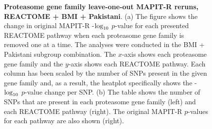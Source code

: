 \documentclass[12pt,a4paper]{article}
\def\log{{\rm log}}
\begin{document}
\begin{figure}[ht]
\centering
\vspace*{-.5cm}
\par
{}
\caption[TBD]{\textbf{Proteasome gene family leave-one-out MAPIT-R reruns, REACTOME + BMI + Pakistani}. (a) The figure shows the change in original MAPIT-R -$\log_{10}$ $p$-value for each presented REACTOME pathway when each proteasome gene family is removed one at a time. The analyses were conducted in the BMI + Pakistani subgroup combination. The $x$-axis shows each proteasome gene family and the $y$-axis shows each REACTOME pathway. Each column has been scaled by the number of SNPs present in the given gene family and, as a result, the heatplot specifically shows the -$\log_{10}$ $p$-value change per SNP. (b) The table shows the number of SNPs that are present in each proteasome gene family (left) and each REACTOME pathway (right). The original MAPIT-R $p$-values for each pathway are also shown (right).}
\label{InterPath-Supp-Figure-Prot-Heatplots-Pakistani}
\end{figure}
\clearpage
\addtocounter{figure}{-1}
\addtocounter{CharNumber5}{1}
\end{document}
